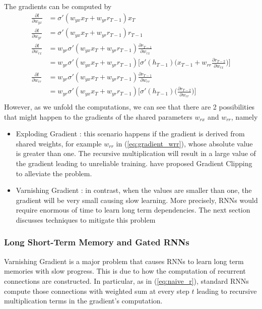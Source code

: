 The gradients can be computed by 
\begin{align}
	\frac{\partial l}{\partial w_{yx}} &= \sigma'(w_{yx} x_T   + w_{yr} r_{T-1}) x_T \\
	\frac{\partial l}{\partial w_{yr}} &= \sigma'(w_{yx} x_T   + w_{yr} r_{T-1}) r_{T-1} \\
	\frac{\partial l}{\partial w_{rx}} &= 	w_{yr} \sigma'(w_{yx} x_T   + w_{yr} r_{T-1}) \frac{\partial r_{T-1}}{\partial w_{rx}} \\
	&= w_{yr} \sigma'(w_{yx} x_T   + w_{yr} r_{T-1})  \Bigg[ \sigma'(h_{T-1}) \bigg( x_{T-1} + w_{rr}  \frac{\partial r_{T-2}}{\partial w_{rx}} \bigg) \Bigg]  \label{eq:gradient_wrr}  \\
	\frac{\partial l}{\partial w_{rr}} &= w_{yr} \sigma'(w_{yx} x_T   + w_{yr} r_{T-1})  \frac{\partial r_{T-1}}{\partial w_{rr}}  \\
	&= w_{yr} \sigma'(w_{yx} x_T   + w_{yr} r_{T-1})  \Bigg[ \sigma'(h_{T-1}) \bigg( \frac{\partial r_{T-2}}{\partial w_{rr}} \bigg) \Bigg] \\
\end{align}
However, as we unfold the computations, we can see that there are 2 possibilities that might happen to the gradients of the shared parameters $w_{rx}$ and $ w_{rr}$, namely
\begin{itemize}
	\item Exploding Gradient : this scenario happens if the gradient is derived from shared weights, for example $w_{rr}$ in  (\ref{eq:gradient_wrr}), whose absolute value is greater than one. The recursive multiplication will result in a large value of the gradient leading to unreliable training. \cite{PascanuUnderstandingexplodinggradient2012} have proposed Gradient Clipping to alleviate the problem.
	\item Varnishing Gradient : in contrast, when the values are smaller than one, the gradient will be very small causing slow learning. More precisely, RNNs would require enormous of time to learn long term dependencies. The next section discusses techniques to mitigate this problem
\end{itemize}


\subsubsection{Long Short-Term Memory and Gated RNNs}
Varnishing Gradient is a major problem that causes RNNs to learn long term memories with slow progress. This is due to how the computation of recurrent connections are constructed. In particular, as in (\ref{eq:naive_r}), standard RNNs compute those connections with weighted sum at every step $t$ leading to recursive multiplication terms in the gradient's computation.

